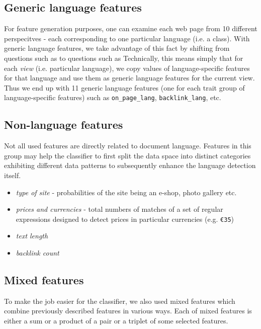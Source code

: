 \documentclass[12pt,a4paper]{article}			%
\begin{document}
  \subsection{Generic language features}
    For feature generation purposes, one can examine each web page from 10 different perspecitves -
    each corresponding to one particular language (i.e. a class). With generic language features, we
    take advantage of this fact by shifting from questions such as  to questions 
    such as  Technically, this means simply
    that for each \textit{view} (i.e. particular language), we copy values of language-specific
    features for that language and use them as generic language features for the current view. Thus
    we end up with 11 generic language features (one for each trait group of language-specific
    features) such as \texttt{on\_page\_lang}, \texttt{backlink\_lang}, etc.

  \subsection{Non-language features}
    Not all used features are directly related to document language. Features in this group may help the
    classifier to first split the data space into distinct categories exhibiting different data patterns 
    to subsequently enhance the language detection itself. 

    \begin{itemize}
      \item \textit{type of site} - probabilities of the site being an e-shop, photo gallery etc.
      \item \textit{prices and currencies} - total numbers of matches of a set of regular
      expressions designed to detect prices in particular currencies (e.g. \texttt{\euro 35}) 
      \item \textit{text length} 
      \item \textit{backlink count}
    \end{itemize}
    
  \subsection{Mixed features}

    To make the job easier for the classifier, we also used mixed features which combine previously
    described features in various ways. Each of mixed features is either a sum or a product of a
    pair or a triplet of some selected features.
\end{document}
